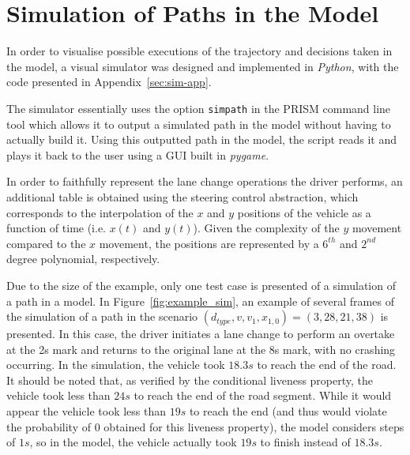 \section{Simulation of Paths in the Model}
\label{sec:simulator}

In order to visualise possible executions of the trajectory and decisions taken in the model, a visual simulator was designed and implemented in \textit{Python}, with the code presented in Appendix~\ref{sec:sim-app}.

The simulator essentially uses the option \texttt{simpath} in the PRISM command line tool which allows it to output a simulated path in the model without having to actually build it. Using this outputted path in the model, the script reads it and plays it back to the user using a GUI built in \textit{pygame}. 

In order to faithfully represent the lane change operations the driver performs, an additional table is obtained using the steering control abstraction, which corresponds to the interpolation of the $x$ and $y$ positions of the vehicle as a function of time (i.e. $x(t)$ and $y(t)$). Given the complexity of the $y$ movement compared to the $x$ movement, the positions are represented by a $6^{th}$ and $2^{nd}$ degree polynomial, respectively. 

Due to the size of the example, only one test case is presented of a simulation of a path in a model. In Figure~\ref{fig:example_sim}, an example of several frames of the simulation of a path in the scenario $(d_{type}, v, v_1, x_{1,0}) = (3, 28, 21, 38)$ is presented. In this case, the driver initiates a lane change to perform an overtake at the 2s mark and returns to the original lane at the 8s mark, with no crashing occurring. In the simulation, the vehicle took $18.3s$ to reach the end of the road. It should be noted that, as verified by the conditional liveness property, the vehicle took less than $24s$ to reach the end of the road segment. While it would appear the vehicle took less than $19s$ to reach the end (and thus would violate the probability of $0$ obtained for this liveness property), the model considers steps of $1s$, so in the model, the vehicle actually took $19s$ to finish instead of $18.3s$.

